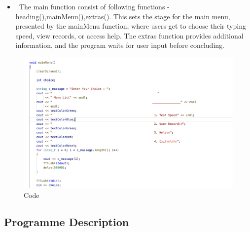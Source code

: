 \begin{itemize}

        \item \texttt{ }The main function consist of following functions - heading(),mainMenu(),extras(). This sets the stage for the main menu, presented by the mainMenu function, where users get to choose their typing speed, view records, or access help. The extras function provides additional information, and the program waits for user input before concluding.
    \end{itemize}
\newpage
\begin{figure}[h]
     \includegraphics[scale=0.25]{CodeScreenShot/CleanShot 2023-12-05 at 09.19.29@2x.png}
    \caption{Code}
    \label{fig:code-screenshots}
\end{figure}

\subsection{Programme Description}

